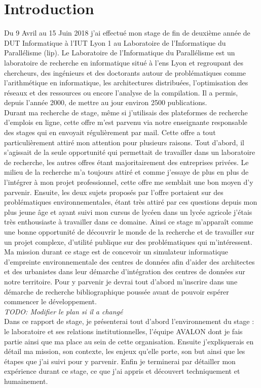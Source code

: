 \newpage
\section*{Introduction}

Du 9 Avril au 15 Juin 2018 j'ai effectué mon stage de fin de deuxième année de DUT Informatique à l'IUT Lyon 1 au Laboratoire de l'Informatique du Parallélisme (\gls{lip}).
Le Laboratoire de l'Informatique du Parallélisme est un laboratoire de recherche en informatique situé à l'\gls{ens} Lyon et regroupant des chercheurs, des ingénieurs et des doctorants autour de problématiques comme l'arithmétique en informatique, les architectures distribuées, l'optimisation des réseaux et des ressources ou encore l'analyse de la compilation. Il a permis, depuis l'année 2000, de mettre au jour environ 2500 publications.\\

Durant ma recherche de stage, même si j'utilisais des plateformes de recherche d'emplois en ligne, cette offre m'est parvenu via notre enseignante responsable des stages qui en envoyait régulièrement par mail. Cette offre a tout particulièrement attiré mon attention pour plusieurs raisons. Tout d'abord, il s'agissait de la seule opportunité qui permettait de travailler dans un laboratoire de recherche, les autres offres étant majoritairement des entreprises privées. Le milieu de la recherche m'a toujours attiré et comme j'essaye de plus en plus de l'intégrer à mon projet professionnel, cette offre me semblait une bon moyen d'y parvenir. Ensuite, les deux sujets proposés par l'offre portaient sur des problématiques environnementales, étant très attiré par ces questions depuis mon plus jeune âge et ayant suivi mon cursus de lycéen dans un lycée agricole j'étais très enthousiaste à travailler dans ce domaine. Ainsi ce stage m'apparaît comme une bonne opportunité de découvrir le monde de la recherche et de travailler sur un projet complexe, d'utilité publique sur des problématiques qui m'intéressent.\\

Ma mission durant ce stage est de concevoir un simulateur informatique d'empreinte environnementale des centres de données afin d'aider des architectes et des urbanistes dans leur démarche d'intégration des centres de données sur notre territoire. Pour y parvenir je devrai tout d'abord m'inscrire dans une démarche de recherche bibliographique poussée avant de pouvoir espérer commencer le développement.\\

\emph{TODO: Modifier le plan si il a changé}\\
Dans ce rapport de stage, je présenterai tout d'abord l'environnement du stage : le laboratoire et ses relations institutionnelles, l'équipe AVALON dont je fais partie ainsi que ma place au sein de cette organisation. Ensuite j'expliquerais en détail ma mission, son contexte, les enjeux qu'elle porte, son but ainsi que les étapes que j'ai suivi pour y parvenir. Enfin je terminerai par détailler mon expérience durant ce stage, ce que j'ai appris et découvert techniquement et humainement.